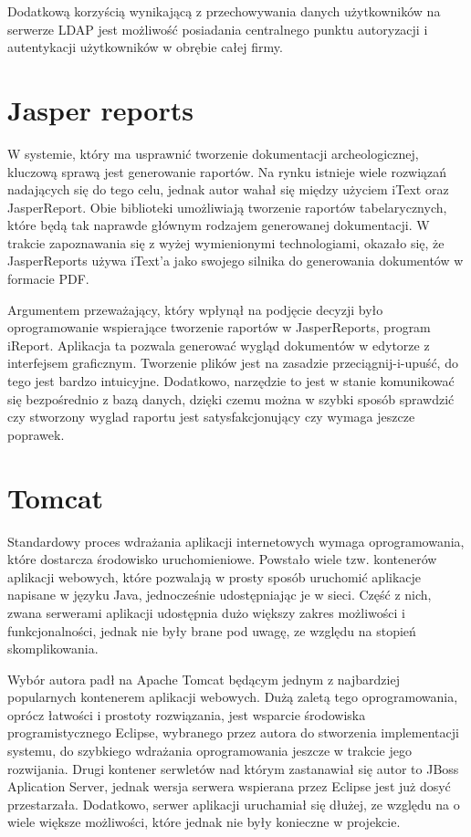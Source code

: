 Dodatkową korzyścią wynikającą z przechowywania danych użytkowników na serwerze LDAP jest możliwość posiadania centralnego punktu autoryzacji i autentykacji użytkowników w obrębie całej firmy. 

\section{Jasper reports}
W systemie, który ma usprawnić tworzenie dokumentacji archeologicznej, kluczową sprawą jest generowanie raportów. Na rynku istnieje wiele rozwiązań nadających się do tego celu, jednak autor wahał się między użyciem iText oraz JasperReport. Obie biblioteki umożliwiają tworzenie raportów tabelarycznych, które będą tak naprawde głównym rodzajem generowanej dokumentacji. W trakcie zapoznawania się z wyżej wymienionymi technologiami, okazało się, że JasperReports używa iText'a jako swojego silnika do generowania dokumentów w formacie PDF. 

Argumentem przeważający, który wpłynął na podjęcie decyzji było oprogramowanie wspierające tworzenie raportów w JasperReports, program iReport. Aplikacja ta pozwala generować wygląd dokumentów w edytorze z interfejsem graficznym. Tworzenie plików jest na zasadzie przeciągnij-i-upuść, do tego jest bardzo intuicyjne. Dodatkowo, narzędzie to jest w stanie komunikować się bezpośrednio z bazą danych, dzięki czemu można w szybki sposób sprawdzić czy stworzony wyglad raportu jest satysfakcjonujący czy wymaga jeszcze poprawek. 

\section{Tomcat}
Standardowy proces wdrażania aplikacji internetowych wymaga oprogramowania, które dostarcza środowisko uruchomieniowe. Powstało wiele tzw. kontenerów aplikacji webowych, które pozwalają w prosty sposób uruchomić aplikacje napisane w języku Java, jednocześnie udostępniając je w sieci. Część z nich, zwana serwerami aplikacji udostępnia dużo większy zakres możliwości i funkcjonalności, jednak nie były brane pod uwagę, ze względu na stopień skomplikowania. 

\newpage
Wybór autora padł na Apache Tomcat będącym jednym z najbardziej popularnych kontenerem aplikacji webowych. Dużą zaletą tego oprogramowania, oprócz łatwości i prostoty rozwiązania, jest wsparcie środowiska programistycznego Eclipse, wybranego przez autora do stworzenia implementacji systemu, do szybkiego wdrażania oprogramowania jeszcze w trakcie jego rozwijania. Drugi kontener serwletów nad którym zastanawiał się autor to JBoss Aplication Server, jednak wersja serwera wspierana przez Eclipse jest już dosyć przestarzała. Dodatkowo, serwer aplikacji uruchamiał się dłużej, ze względu na o wiele większe możliwości, które jednak nie były konieczne w projekcie.

